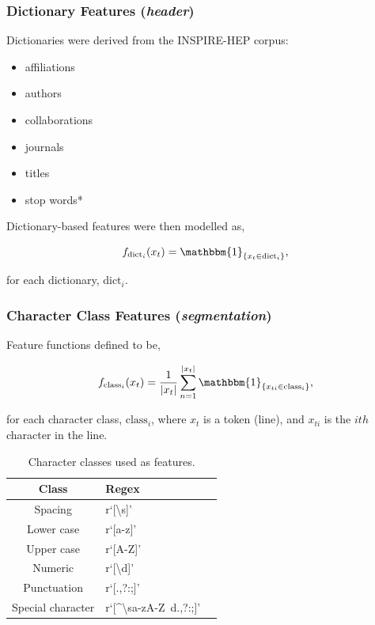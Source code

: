 \documentclass{beamer}
\begin{document}

\begin{frame}
\frametitle{Dictionary Features (\emph{header})}

Dictionaries were derived from the INSPIRE-HEP corpus:

\begin{itemize}
\item affiliations
\item authors
\item collaborations
\item journals
\item titles
\item stop words*
\end{itemize}

Dictionary-based features were then modelled as,

$$
f_{\text{dict}_i}(x_t) = \mathbbm{1}_{\{x_t \in \text{dict}_i\}},
$$

for each dictionary, $\text{dict}_i$.

\end{frame}


\begin{frame}
\frametitle{Character Class Features (\emph{segmentation})}

Feature functions defined to be,

$$
f_{\text{class}_i}(x_t) = \frac{1}{|x_t|}\sum_{n=1}^{|x_t|} \mathbbm{1}_{\{x_{ti} \in \text{class}_i\}},
$$

for each character class, $\text{class}_i$, where $x_t$ is a token (line), and $x_{ti}$ is the $ith$ character in the line.

\begin{table}[h]
\begin{center}
\begin{tabular}{|c|l|l|}
\hline
Class & Regex\\
\hline
Spacing & r`[\textbackslash s]'\\
Lower case & r`[a-z]'\\
Upper case & r`[A-Z]'\\
Numeric & r`[\textbackslash d]'\\
Punctuation & r`[\(\).,?:;]'\\
Special character & r`[\^{}\textbackslash sa-zA-Z\ d\(\).,?:;]'\\
\hline
\end{tabular}
\caption[]{Character classes used as features.}
\end{center}
\end{table}

\end{frame}
\end{document}
